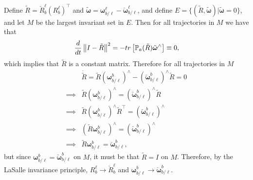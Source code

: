 

Define $\tilde{R} = \breve{R}_b^\ell (R_b^\ell)^\top$ and $\tilde{\boldsymbol{\omega}}=\boldsymbol{\omega}_{b/\ell}^\ell-\breve{\boldsymbol{\omega}}_{b/\ell}^\ell$, 
and define $E=\{(\tilde{R},\tilde{\boldsymbol{\omega}}) | \tilde{\boldsymbol{\omega}}=0\}$, 
and let $M$ be the largest invariant set in $E$. Then for all trajectories in $M$ we have that
\[
\frac{d}{dt}\left\|I-\tilde{R}\right\|^2 = -tr\left[\mathbb{P}_a(\tilde{R})\tilde{\boldsymbol{\omega}}^\wedge\right] \equiv 0,
\]
which implies that $\tilde{R}$ is a constant matrix.  
Therefore for all trajectories in $M$
\begin{align*}
& \dot{\tilde{R}} = \tilde{R}(\boldsymbol{\omega}_{b/\ell}^b)^\wedge - (\breve{\boldsymbol{\omega}}_{b/\ell}^b)^\wedge \tilde{R} = 0 \\
\implies & \tilde{R}(\boldsymbol{\omega}_{b/\ell}^b)^\wedge = (\breve{\boldsymbol{\omega}}_{b/\ell}^b)^\wedge \tilde{R} \\
\implies & \tilde{R}(\boldsymbol{\omega}_{b/\ell}^b)^\wedge \tilde{R}^\top = (\breve{\boldsymbol{\omega}}_{b/\ell}^b)^\wedge  \\
\implies & (\tilde{R}\boldsymbol{\omega}_{b/\ell}^b)^\wedge = (\breve{\boldsymbol{\omega}}_{b/\ell}^b)^\wedge  \\
\implies & \tilde{R}\boldsymbol{\omega}_{b/\ell}^b = \breve{\boldsymbol{\omega}}_{b/\ell}^b,
\end{align*}
but since $\boldsymbol{\omega}_{b/\ell}^b=\breve{\boldsymbol{\omega}}_{b/\ell}^b$ on $M$, it must be that $\tilde{R}=I$ on $M$.  
Therefore, by the LaSalle invariance principle, $R_b^\ell \to \breve{R}_b^\ell$ and $\boldsymbol{\omega}_{b/\ell}^b\to\breve{\boldsymbol{\omega}}_{b/\ell}^b$.













